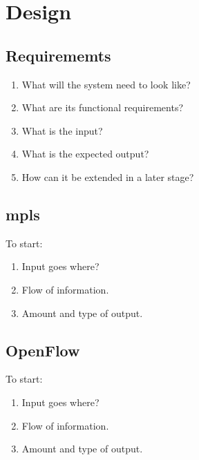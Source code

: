 \section{Design} %
\label{sec:design}

\subsection{Requirememts} %
\label{sub:requirememts}
\begin{enumerate}
	\item What will the system need to look like?
	\item What are its functional requirements?
	\item What is the input?
	\item What is the expected output?
	\item How can it be extended in a later stage?
\end{enumerate}



\subsection{\acs{mpls}} %
\label{sub:contemporary}
To start:
\begin{enumerate}
	\item Input goes where?
	\item Flow of information.
	\item Amount and type of output.
\end{enumerate}




\subsection{OpenFlow} %
\label{sub:openflow}
To start:
\begin{enumerate}
	\item Input goes where?
	\item Flow of information.
	\item Amount and type of output.
\end{enumerate}






